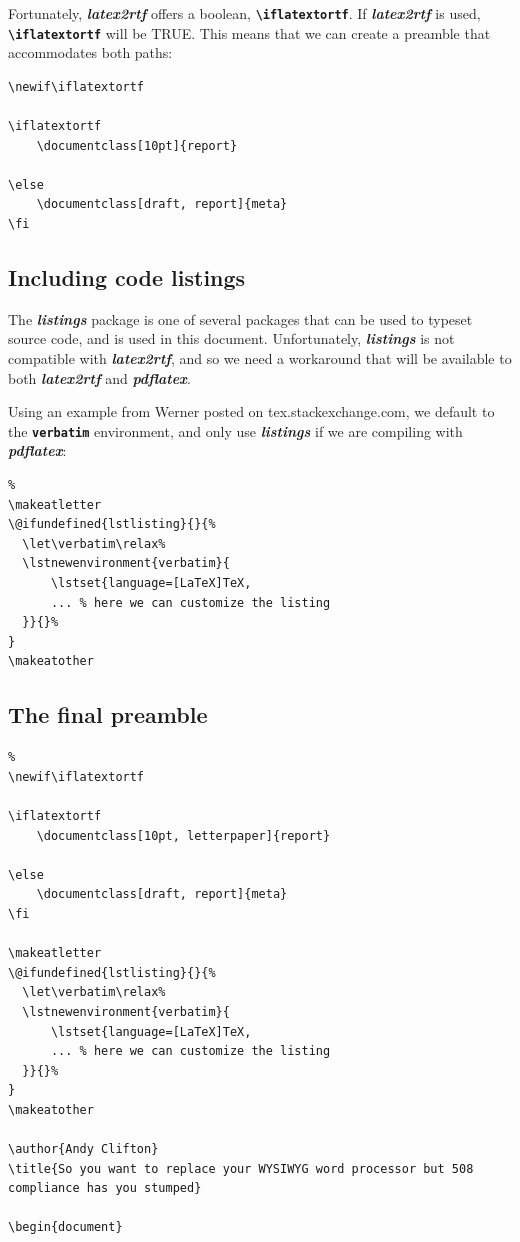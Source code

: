 \documentclass[12pt,letterpaper]{article}
\newcommand{\packagename}[1]{\textbf{\emph{#1}}}
\newcommand{\envname}[1]{\textbf{\texttt{#1}}}
\begin{document}
Fortunately, \packagename{latex2rtf} offers a boolean, \envname{\textbackslash iflatextortf}. If \packagename{latex2rtf} is used, \envname{\textbackslash iflatextortf} will be TRUE. This means that we can create a preamble that accommodates both paths:

\begin{verbatim}
\newif\iflatextortf

\iflatextortf
    \documentclass[10pt]{report}
    
\else
    \documentclass[draft, report]{meta} 
\fi
\end{verbatim}

\subsection{Including code listings}
The \packagename{listings} package is one of several packages that can be used to typeset source code, and is used in this document. Unfortunately, \packagename{listings} is not compatible with \packagename{latex2rtf}, and so we need a workaround that will be available to both \packagename{latex2rtf} and \packagename{pdflatex}. 

Using an example from Werner posted on tex.stackexchange.com, we default to the \envname{verbatim} environment, and only use \packagename{listings} if we are compiling with \packagename{pdflatex}:

\begin{verbatim}%
\makeatletter
\@ifundefined{lstlisting}{}{%
  \let\verbatim\relax%
  \lstnewenvironment{verbatim}{
      \lstset{language=[LaTeX]TeX,
      ... % here we can customize the listing
  }}{}%
}
\makeatother
\end{verbatim}

\subsection{The final preamble}

\begin{verbatim}%
\newif\iflatextortf

\iflatextortf
    \documentclass[10pt, letterpaper]{report}
    
\else
    \documentclass[draft, report]{meta} 
\fi

\makeatletter
\@ifundefined{lstlisting}{}{%
  \let\verbatim\relax%
  \lstnewenvironment{verbatim}{
      \lstset{language=[LaTeX]TeX,
      ... % here we can customize the listing
  }}{}%
}
\makeatother

\author{Andy Clifton}
\title{So you want to replace your WYSIWYG word processor but 508 compliance has you stumped}
 
\begin{document}

\end{verbatim}
\end{document}

